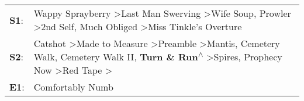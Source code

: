\begin{supertabular}{p{0.03\textwidth}p{0.92\textwidth}}
 \textbf{S1}:  &                                                                                                                                                                              Wappy Sprayberry\textsuperscript{} \textgreater \enspace Last Man Swerving\textsuperscript{} \textgreater \enspace Wife Soup\textsuperscript{}, \enspace Prowler\textsuperscript{} \textgreater \enspace 2nd Self\textsuperscript{}, \enspace Much Obliged\textsuperscript{} \textgreater \enspace Miss Tinkle's Overture\textsuperscript{}  \enspace  \\
 \textbf{S2}:  &  Catshot\textsuperscript{} \textgreater \enspace Made to Measure\textsuperscript{} \textgreater \enspace Preamble\textsuperscript{} \textgreater \enspace Mantis\textsuperscript{}, \enspace Cemetery Walk\textsuperscript{}, \enspace Cemetery Walk II\textsuperscript{}, \enspace \textbf{Turn \& Run\textsuperscript{$\wedge$}} \textgreater \enspace Spires\textsuperscript{}, \enspace Prophecy Now\textsuperscript{} \textgreater \enspace Red Tape\textsuperscript{} \textgreater {}\textsuperscript{}  \enspace  \\
 \textbf{E1}:  &                                                                                                                                                                                                                                                                                                                                                                                                                                                                                       Comfortably Numb\textsuperscript{}  \enspace  \\
\end{supertabular}
